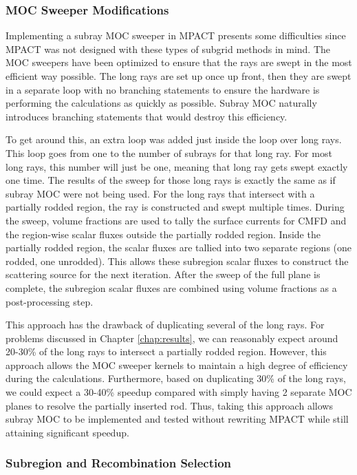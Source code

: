 \subsubsection{MOC Sweeper Modifications}

Implementing a subray MOC sweeper in MPACT presents some difficulties since MPACT was not designed with these types of subgrid methods in mind.  The MOC sweepers have been optimized to ensure that the rays are swept in the most efficient way possible.  The long rays are set up once up front, then they are swept in a separate loop with no branching statements to ensure the hardware is performing the calculations as quickly as possible.  Subray MOC naturally introduces branching statements that would destroy this efficiency.

To get around this, an extra loop was added just inside the loop over long rays.  This loop goes from one to the number of subrays for that long ray.  For most long rays, this number will just be one, meaning that long ray gets swept exactly one time.  The results of the sweep for those long rays is exactly the same as if subray MOC were not being used.  For the long rays that intersect with a partially rodded region, the ray is constructed and swept multiple times.  During the sweep, volume fractions are used to tally the surface currents for CMFD and the region-wise scalar fluxes outside the partially rodded region.  Inside the partially rodded region, the scalar fluxes are tallied into two separate regions (one rodded, one unrodded).  This allows these subregion scalar fluxes to construct the scattering source for the next iteration.  After the sweep of the full plane is complete, the subregion scalar fluxes are combined using volume fractions as a post-processing step.

This approach has the drawback of duplicating several of the long rays.  For problems discussed in Chapter \ref{chap:results}, we can reasonably expect around 20-30\% of the long rays to intersect a partially rodded region.  However, this approach allows the MOC sweeper kernels to maintain a high degree of efficiency during the calculations.  Furthermore, based on duplicating 30\% of the long rays, we could expect a 30-40\% speedup compared with simply having 2 separate MOC planes to resolve the partially inserted rod.  Thus, taking this approach allows subray MOC to be implemented and tested without rewriting MPACT while still attaining significant speedup.

\subsubsection{Subregion and Recombination Selection}\label{sss:recombination}

